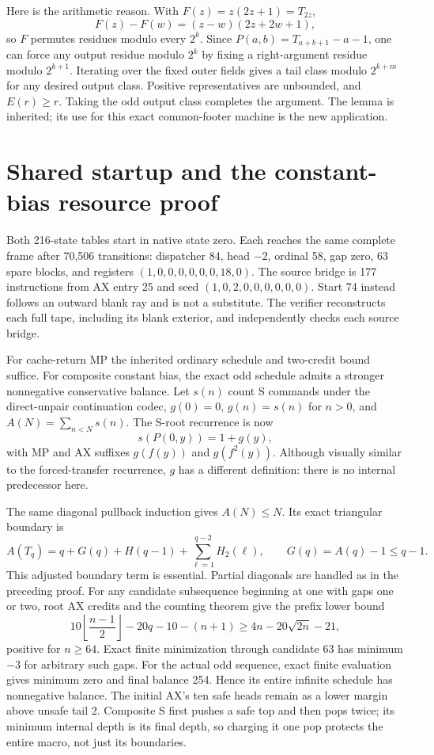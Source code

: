 \documentclass[11pt]{article}
\begin{document}
Here is the arithmetic reason. With $F(z)=z(2z+1)=T_{2z}$,
\[
 F(z)-F(w)=(z-w)(2z+2w+1),
\]
so $F$ permutes residues modulo every $2^k$. Since $P(a,b)=T_{a+b+1}-a-1$, one can force any output residue modulo $2^k$ by fixing a right-argument residue modulo $2^{k+1}$. Iterating over the fixed outer fields gives a tail class modulo $2^{k+m}$ for any desired output class. Positive representatives are unbounded, and $E(r)\ge r$. Taking the odd output class completes the argument. The lemma is inherited; its use for this exact common-footer machine is the new application.
\section{Shared startup and the constant-bias resource proof}
Both 216-state tables start in native state zero. Each reaches the same complete frame after 70,506 transitions: dispatcher 84, head $-2$, ordinal 58, gap zero, 63 spare blocks, and registers $(1,0,0,0,0,0,0,18,0)$. The source bridge is 177 instructions from AX entry 25 and seed $(1,0,2,0,0,0,0,0,0)$. Start 74 instead follows an outward blank ray and is not a substitute. The verifier reconstructs each full tape, including its blank exterior, and independently checks each source bridge.

For cache-return MP the inherited ordinary schedule and two-credit bound suffice. For composite constant bias, the exact odd schedule admits a stronger nonnegative conservative balance. Let $s(n)$ count S commands under the direct-unpair continuation codec, $g(0)=0$, $g(n)=s(n)$ for $n>0$, and $A(N)=\sum_{n<N}s(n)$. The S-root recurrence is now
\[
 s(P(0,y))=1+g(y),
\]
with MP and AX suffixes $g(f(y))$ and $g(f^2(y))$. Although visually similar to the forced-transfer recurrence, $g$ has a different definition: there is no internal predecessor here.

The same diagonal pullback induction gives $A(N)\le N$. Its exact triangular boundary is
\[
 A(T_q)=q+G(q)+H(q-1)+\sum_{\ell=1}^{q-2}H_2(\ell),
 \qquad G(q)=A(q)-1\le q-1.
\]
This adjusted boundary term is essential. Partial diagonals are handled as in the preceding proof. For any candidate subsequence beginning at one with gaps one or two, root AX credits and the counting theorem give the prefix lower bound
\[
 10\left\lfloor\frac{n-1}{2}\right\rfloor-20q-10-(n+1)
 \ge4n-20\sqrt{2n}-21,
\]
positive for $n\ge64$. Exact finite minimization through candidate 63 has minimum $-3$ for arbitrary such gaps. For the actual odd sequence, exact finite evaluation gives minimum zero and final balance 254. Hence its entire infinite schedule has nonnegative balance. The initial AX's ten safe heads remain as a lower margin above unsafe tail 2. Composite S first pushes a safe top and then pops twice; its minimum internal depth is its final depth, so charging it one pop protects the entire macro, not just its boundaries.
\end{document}
